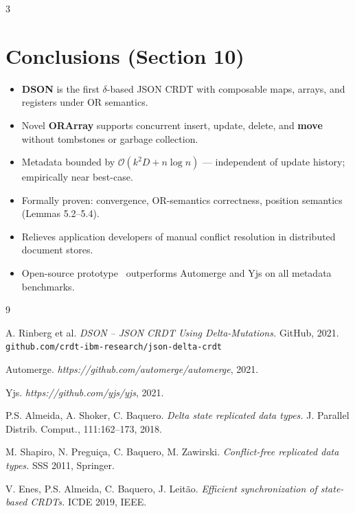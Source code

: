 \documentclass[a0,portrait]{a0poster}
\begin{document}
\begin{multicols}{3}

\color{Black}
\section*{Conclusions (Section 10)}

\begin{itemize}
  \item \textbf{DSON} is the first $\delta$-based JSON CRDT with composable maps, arrays, and registers under OR semantics.
  \item Novel \textbf{ORArray} supports concurrent insert, update, delete, and \textbf{move} without tombstones or garbage collection.
  \item Metadata bounded by $\mathcal{O}(k^2D + n\log n)$ --- independent of update history; empirically near best-case.
  \item Formally proven: convergence, OR-semantics correctness, position semantics (Lemmas 5.2--5.4).
  \item Relieves application developers of manual conflict resolution in distributed document stores.
  \item Open-source prototype~\cite{rinberg2021dson} outperforms Automerge and Yjs on all metadata benchmarks.
\end{itemize}


\color{Black}

\begin{thebibliography}{9}
\setlength{\itemsep}{0pt}
\setlength{\parsep}{0pt}

A. Rinberg et al.
\textit{DSON -- JSON CRDT Using Delta-Mutations.}
GitHub, 2021. \texttt{github.com/crdt-ibm-research/json-delta-crdt}

Automerge.
\textit{https://github.com/automerge/automerge}, 2021.

Yjs.
\textit{https://github.com/yjs/yjs}, 2021.

P.S. Almeida, A. Shoker, C. Baquero.
\textit{Delta state replicated data types.}
J. Parallel Distrib. Comput., 111:162--173, 2018.

M. Shapiro, N. Pregui\c{c}a, C. Baquero, M. Zawirski.
\textit{Conflict-free replicated data types.}
SSS 2011, Springer.

V. Enes, P.S. Almeida, C. Baquero, J. Leit\~{a}o.
\textit{Efficient synchronization of state-based CRDTs.}
ICDE 2019, IEEE.

\end{thebibliography}

\end{multicols}
\end{document}
